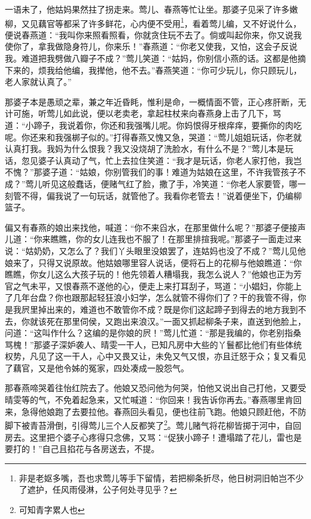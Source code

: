 \documentclass[12pt,oneside]{book}
\begin{document}
一语未了，他姑妈果然拄了拐走来。莺儿、春燕等忙让坐。那婆子见采了许多嫩柳，又见藕官等都采了许多鲜花，心内便不受用\footnote{非是老妪多嘴，吾也求莺儿等手下留情，若把柳条折尽，他日树洞旧帕岂不少了遮护，任风雨侵淋，公子何处寻见乎？}，看着莺儿编，又不好说什么，便说春燕道：“我叫你来照看照看，你就贪住玩不去了。倘或叫起你来，你又说我使你了，拿我做隐身符儿，你来乐！”春燕道：“你老又使我，又怕，这会子反说我。难道把我劈做八瓣子不成？”莺儿笑道：“姑妈，你别信小燕的话。这都是他摘下来的，烦我给他编，我撵他，他不去。”春燕笑道：“你可少玩儿，你只顾玩儿，老人家就认真了。”

那婆子本是愚顽之辈，兼之年近昏眊，惟利是命，一概情面不管，正心疼肝断，无计可施，听莺儿如此说，便以老卖老，拿起柱杖来向春燕身上击了几下，骂道：“小蹄子，我说着你，你还和我强嘴儿呢。你妈恨得牙根痒痒，要撕你的肉吃呢。你还来和我强梆子似的。”打得春燕又愧又急，哭道：“莺儿姐姐玩话，你老就认真打我。我妈为什么恨我？我又没烧胡了洗脸水，有什么不是？”莺儿本是玩话，忽见婆子认真动了气，忙上去拉住笑道：“我才是玩话，你老人家打他，我岂不愧？”那婆子道：“姑娘，你别管我们的事！难道为姑娘在这里，不许我管孩子不成？”莺儿听见这般蠢话，便赌气红了脸，撒了手，冷笑道：“你老人家要管，哪一刻管不得，偏我说了一句玩话，就管他了。我看你老管去！”说着便坐下，仍编柳篮子。

偏又有春燕的娘出来找他，喊道：“你不来舀水，在那里做什么呢？”那婆子便接声儿道：“你来瞧瞧，你的女儿连我也不服了！在那里排揎我呢。”那婆子一面走过来说：“姑奶奶，又怎么了？我们丫头眼里没娘罢了，连姑妈也没了不成？”莺儿见他娘来了，只得又说原故。他姑娘哪里容人说话，便将石上的花柳与他娘瞧道：“你瞧瞧，你女儿这么大孩子玩的！他先领着人糟塌我，我怎么说人？”他娘也正为芳官之气未平，又恨春燕不遂他的心，便走上来打耳刮子，骂道：“小娼妇，你能上了几年台盘？你也跟那起轻狂浪小妇学，怎么就管不得你们了？干的我管不得，你是我屄里掉出来的，难道也不敢管你不成？既是你们这起蹄子到得去的地方我到不去，你就该死在那里伺侯，又跑出来浪汉。”一面又抓起柳条子来，直送到他脸上，问道：“这叫作什么？这编的是你娘的屄！”莺儿忙道：“那是我编的，你老别指桑骂槐！”那婆子深妒袭人、晴雯一干人，已知凡房中大些的丫鬟都比他们有些体统权势，凡见了这一干人，心中又畏又让，未免又气又恨，亦且迁怒于众；复又看见了藕官，又是他令姊的冤家，四处凑成一股怨气。

那春燕啼哭着往怡红院去了。他娘又恐问他为何哭，怕他又说出自己打他，又要受晴雯等的气，不免着起急来，又忙喊道：“你回来！我告诉你再去。”春燕哪里肯回来，急得他娘跑了去要拉他。春燕回头看见，便也往前飞跑。他娘只顾赶他，不防脚下被青苔滑倒，引得莺儿三个人反都笑了\footnote{可知青字累人也}。莺儿赌气将花柳皆掷于河中，自回房去。这里把个婆子心疼得只念佛，又骂：“促狭小蹄子！遭塌踏了花儿，雷也是要打的！”自己且掐花与各房送去，不提。
\end{document}
